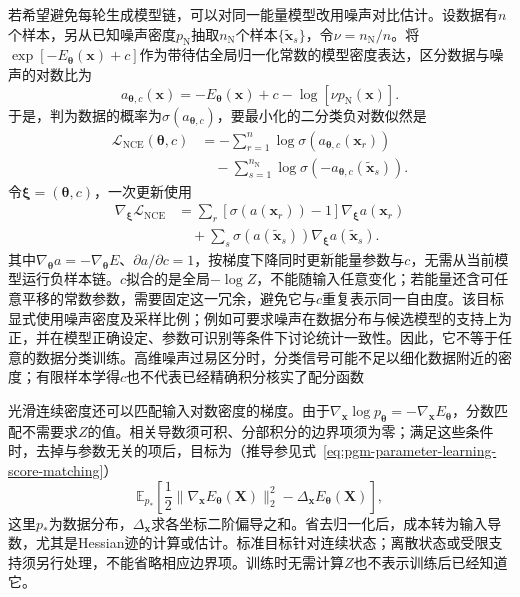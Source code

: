 若希望避免每轮生成模型链，可以对同一能量模型改用噪声对比估计。设数据有$n$个样本，另从已知噪声密度$p_{\mathrm{N}}$抽取$n_{\mathrm{N}}$个样本$\{\widetilde{\bm{x}}_s\}$，令$\nu=n_{\mathrm{N}}/n$。将$\exp[-E_{\bm{\theta}}(\bm{x})+c]$作为带待估全局归一化常数的模型密度表达，区分数据与噪声的对数比为
\[
  a_{\bm{\theta},c}(\bm{x})
    =-E_{\bm{\theta}}(\bm{x})+c
           -\log[\nu p_{\mathrm{N}}(\bm{x})].
\]
于是，判为数据的概率为$\sigma(a_{\bm{\theta},c})$，要最小化的二分类负对数似然是
\begin{equation}
  \begin{aligned}
  \mathcal{L}_{\mathrm{NCE}}(\bm{\theta},c)
    &=-\sum_{r=1}^n\log\sigma(a_{\bm{\theta},c}(\bm{x}_r))\\
    &\quad-\sum_{s=1}^{n_{\mathrm{N}}}
        \log\sigma(-a_{\bm{\theta},c}(\widetilde{\bm{x}}_s)).
  \end{aligned}
  \label{eq:pgm-energy-models-nce}
\end{equation}
令$\bm{\xi}=(\bm{\theta},c)$，一次更新使用
\[
  \begin{aligned}
  \nabla_{\bm{\xi}}\mathcal{L}_{\mathrm{NCE}}
   &=\sum_r[\sigma(a(\bm{x}_r))-1]\nabla_{\bm{\xi}}a(\bm{x}_r)\\
   &\quad+\sum_s\sigma(a(\widetilde{\bm{x}}_s))
                         \nabla_{\bm{\xi}}a(\widetilde{\bm{x}}_s).
  \end{aligned}
\]
其中$\nabla_{\bm{\theta}}a=-\nabla_{\bm{\theta}}E$、$\partial a/\partial c=1$，按梯度下降同时更新能量参数与$c$，无需从当前模型运行负样本链。$c$拟合的是全局$-\log Z$，不能随输入任意变化；若能量还含可任意平移的常数参数，需要固定这一冗余，避免它与$c$重复表示同一自由度。该目标显式使用噪声密度及采样比例；例如可要求噪声在数据分布与候选模型的支持上为正，并在模型正确设定、参数可识别等条件下讨论统计一致性。因此，它不等于任意的数据分类训练。高维噪声过易区分时，分类信号可能不足以细化数据附近的密度；有限样本学得$c$也不代表已经精确积分核实了配分函数

光滑连续密度还可以匹配输入对数密度的梯度。由于$\nabla_{\bm{x}}\log p_{\bm{\theta}}=-\nabla_{\bm{x}}E_{\bm{\theta}}$，分数匹配不需要求$Z$的值。相关导数须可积、分部积分的边界项须为零；满足这些条件时，去掉与参数无关的项后，目标为（推导参见式~\eqref{eq:pgm-parameter-learning-score-matching}）
\[
  \mathbb{E}_{p_*}\!\left[
      \frac12\lVert\nabla_{\bm{x}}E_{\bm{\theta}}(\bm{X})\rVert_2^2
      -\Delta_{\bm{x}}E_{\bm{\theta}}(\bm{X})\right],
\]
这里$p_*$为数据分布，$\Delta_{\bm{x}}$求各坐标二阶偏导之和。省去归一化后，成本转为输入导数，尤其是Hessian迹的计算或估计。标准目标针对连续状态；离散状态或受限支持须另行处理，不能省略相应边界项。训练时无需计算$Z$也不表示训练后已经知道它。

